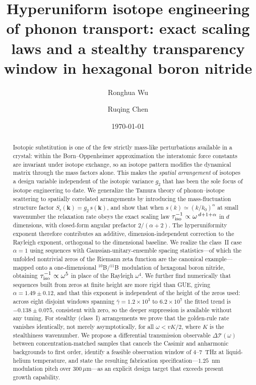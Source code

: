 \documentclass[
  aps,
  prl,
  reprint,
  amsmath,
  amssymb,
  superscriptaddress,
  floatfix,
  nofootinbib
]{revtex4-2}
\newcommand{\tenB}{$^{10}$B}
\newcommand{\elevenB}{$^{11}$B}
\newcommand{\kzero}{k_{0}}
\newcommand{\Tr}{\mathcal{T}}
\begin{document}
\title{Hyperuniform isotope engineering of phonon transport: exact scaling
laws and a stealthy transparency window in hexagonal boron nitride}

\author{Ronghua Wu}
\author{Ruqing Chen}

\date{\today}

\begin{abstract}
Isotopic substitution is one of the few strictly mass-like perturbations
available in a crystal: within the Born--Oppenheimer approximation the
interatomic force constants are invariant under isotope exchange, so an
isotope pattern modifies the dynamical matrix through the mass factors alone.
This makes the \emph{spatial arrangement} of isotopes a design variable
independent of the isotopic variance $g_2$ that has been the sole focus of
isotope engineering to date. We generalize the Tamura theory of
phonon--isotope scattering to spatially correlated arrangements by introducing
the mass-fluctuation structure factor $S_\epsilon(\bm{k})=g_2\,s(\bm{k})$, and
show that when $s(k)\simeq(k/\kzero)^\alpha$ at small wavenumber the relaxation
rate obeys the exact scaling law $\tau_{\rm iso}^{-1}\propto\omega^{\,d+1+\alpha}$
in $d$ dimensions, with closed-form angular prefactor $2/(\alpha+2)$. The
hyperuniformity exponent therefore contributes an additive,
dimension-independent correction to the Rayleigh exponent, orthogonal to the
dimensional baseline. We realize the class~II case $\alpha=1$ using
sequences with Gaussian-unitary-ensemble spacing statistics---of which the
unfolded nontrivial zeros of the Riemann zeta function are the canonical
example---mapped onto a one-dimensional \tenB/\elevenB\ modulation of
hexagonal boron nitride, obtaining $\tau_{\rm iso}^{-1}\propto\omega^5$ in
place of the Rayleigh $\omega^4$. We further find numerically that sequences built
from zeros at finite height are more rigid than GUE, giving
$\alpha=1.49\pm0.12$, and that this exponent is independent of the height of
the zeros used: across eight disjoint windows spanning
$\bar\gamma=1.2\times10^{3}$ to $6.2\times10^{7}$ the fitted trend is
$-0.138\pm0.075$, consistent with zero, so the deeper suppression is available
without any tuning. For stealthy (class~I) arrangements we prove
that the golden-rule rate vanishes identically, not merely asymptotically, for
all $\omega<vK/2$, where $K$ is the stealthiness wavenumber. We propose a
differential transmission observable $\Delta\Tr(\omega)$ between
concentration-matched samples that cancels the Casimir and anharmonic
backgrounds to first order, identify a feasible observation window of
$4$--$7$~THz at liquid-helium temperature, and state the resulting fabrication
specification---$1.25$~nm modulation pitch over $300\,\mu$m---as an explicit
design target that exceeds present growth capability.
\end{abstract}
\end{document}

